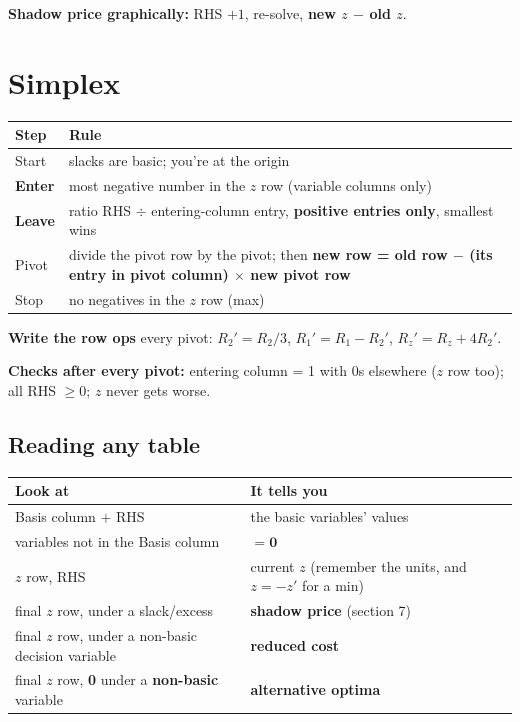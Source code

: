 \documentclass[10pt,a4paper]{article}
\newcommand{\thead}[1]{\textbf{#1}}
\begin{document}
\textbf{Shadow price graphically:} RHS $+1$, re-solve, \textbf{new $z$ $-$ old $z$}.

\section{Simplex}

\begin{tabularx}{\linewidth}{@{}l L@{}}
\toprule
\thead{Step} & \thead{Rule} \\
\midrule
Start & slacks are basic; you're at the origin \\
\textbf{Enter} & most negative number in the $z$ row (variable columns only) \\
\textbf{Leave} & ratio RHS $\div$ entering-column entry, \textbf{positive entries only}, smallest wins \\
Pivot & divide the pivot row by the pivot; then \textbf{new row = old row $-$ (its entry in pivot column) $\times$ new pivot row} \\
Stop & no negatives in the $z$ row (max) \\
\bottomrule
\end{tabularx}

\textbf{Write the row ops} every pivot: $R_2' = R_2/3$,\; $R_1' = R_1 - R_2'$,\; $R_z' = R_z + 4R_2'$.

\textbf{Checks after every pivot:} entering column = 1 with 0s elsewhere ($z$ row too); all RHS $\geq 0$; $z$ never gets worse.

\subsection{Reading any table}

\begin{tabularx}{\linewidth}{@{}l L@{}}
\toprule
\thead{Look at} & \thead{It tells you} \\
\midrule
Basis column + RHS & the basic variables' values \\
variables not in the Basis column & $\mathbf{= 0}$ \\
$z$ row, RHS & current $z$ (remember the units, and $z = -z'$ for a min) \\
final $z$ row, under a slack/excess & \textbf{shadow price} (section 7) \\
final $z$ row, under a non-basic decision variable & \textbf{reduced cost} \\
final $z$ row, \textbf{0} under a \textbf{non-basic} variable & \textbf{alternative optima} \\
\bottomrule
\end{tabularx}
\end{document}
